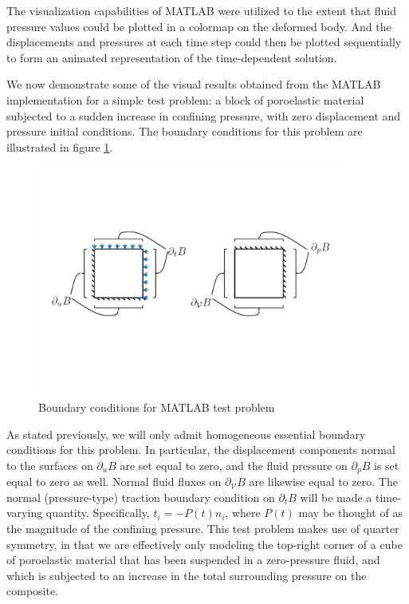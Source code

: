 \documentclass[11pt]{article} %
\begin{document}
The visualization capabilities of MATLAB were utilized to the extent that fluid pressure values could be plotted in a colormap on the deformed body. And the displacements and pressures at each time step could then be plotted sequentially to form an animated representation of the time-dependent solution.

We now demonstrate some of the visual results obtained from the MATLAB implementation for a simple test problem: a block of poroelastic material subjected to a sudden increase in confining pressure, with zero displacement and pressure initial conditions. The boundary conditions for this problem are illustrated in figure \ref{fig:exampleproblembcs}.

\begin{figure} [!ht]
	\centering
	\includegraphics[width = 4.0in,trim=30 180 20 150,clip=true]{exampleproblembcs.pdf}
	\caption{Boundary conditions for MATLAB test problem}
	\label{fig:exampleproblembcs}
\end{figure}

As stated previously, we will only admit homogeneous essential boundary conditions for this problem. In particular, the displacement components normal to the surfaces on $\partial_u B$ are set equal to zero, and the fluid pressure on $\partial_p B$ is set equal to zero as well. Normal fluid fluxes on $\partial_{\mathcal{V}} B$ are likewise equal to zero. The normal (pressure-type) traction boundary condition on $\partial_t B$ will be made a time-varying quantity. Specifically, $t_i = - P(t) n_i$, where $P(t)$ may be thought of as the magnitude of the confining pressure. This test problem makes use of quarter symmetry, in that we are effectively only modeling the top-right corner of a cube of poroelastic material that has been suspended in a zero-pressure fluid, and which is subjected to an increase in the total surrounding pressure on the composite.
\end{document}
